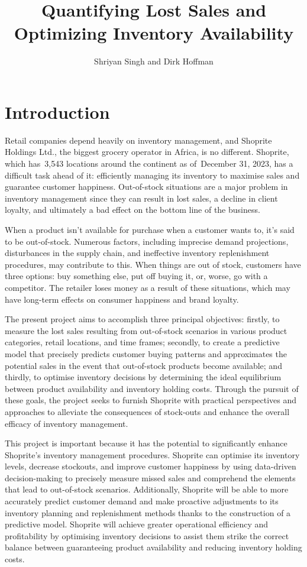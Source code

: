 \documentclass{article}
\title{Quantifying Lost Sales and Optimizing Inventory Availability}
\author{Shriyan Singh and Dirk Hoffman}
\begin{document}
\maketitle


\section{Introduction}

Retail companies depend heavily on inventory management, and Shoprite Holdings Ltd., the biggest grocery operator in Africa, is no different. Shoprite, which has 3,543 locations around the continent as of December 31, 2023, has a difficult task ahead of it: efficiently managing its inventory to maximise sales and guarantee customer happiness. Out-of-stock situations are a major problem in inventory management since they can result in lost sales, a decline in client loyalty, and ultimately a bad effect on the bottom line of the business.

When a product isn't available for purchase when a customer wants to, it's said to be out-of-stock. Numerous factors, including imprecise demand projections, disturbances in the supply chain, and ineffective inventory replenishment procedures, may contribute to this. When things are out of stock, customers have three options: buy something else, put off buying it, or, worse, go with a competitor. The retailer loses money as a result of these situations, which may have long-term effects on consumer happiness and brand loyalty.

The present project aims to accomplish three principal objectives: firstly, to measure the lost sales resulting from out-of-stock scenarios in various product categories, retail locations, and time frames; secondly, to create a predictive model that precisely predicts customer buying patterns and approximates the potential sales in the event that out-of-stock products become available; and thirdly, to optimise inventory decisions by determining the ideal equilibrium between product availability and inventory holding costs. Through the pursuit of these goals, the project seeks to furnish Shoprite with practical perspectives and approaches to alleviate the consequences of stock-outs and enhance the overall efficacy of inventory management.

This project is important because it has the potential to significantly enhance Shoprite's inventory management procedures. Shoprite can optimise its inventory levels, decrease stockouts, and improve customer happiness by using data-driven decision-making to precisely measure missed sales and comprehend the elements that lead to out-of-stock scenarios. Additionally, Shoprite will be able to more accurately predict customer demand and make proactive adjustments to its inventory planning and replenishment methods thanks to the construction of a predictive model. Shoprite will achieve greater operational efficiency and profitability by optimising inventory decisions to assist them strike the correct balance between guaranteeing product availability and reducing inventory holding costs.
\end{document}
